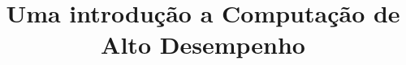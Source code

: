               
%
%
%
% 
%
%
\title{Uma introdução a Computação de Alto Desempenho}

\documentclass[12pt, a4paper]{report}
\usepackage[utf8]{inputenc}
\usepackage[brazil]{babel}
\usepackage[T1]{fontenc}
\usepackage[left=3cm, right=2cm, bottom=2cm, top=3cm]{geometry}
\usepackage[pdftex, hidelinks]{hyperref}
\usepackage{gensymb}

\usepackage{setspace}
\usepackage{graphicx} %
\usepackage{float}
\usepackage{mathptmx}
\usepackage{amsmath}

\allowdisplaybreaks

\usepackage{subfig}

\usepackage[final]{pdfpages}

\usepackage[toc,page]{appendix}

\usepackage{listings}
\lstset{language=Python}    %

